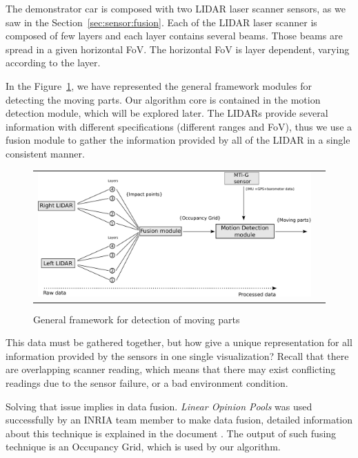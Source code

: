 The demonstrator car is composed with two LIDAR laser scanner sensors, as we saw in the Section~\ref{sec:sensor:fusion}. Each of the LIDAR laser scanner is composed of few layers and each layer contains several beams. Those beams are spread in a given horizontal FoV. The horizontal FoV is layer dependent, varying according to the layer.

In the Figure~\ref{fig:motion:framework}, we have represented the general framework modules for detecting the moving parts. Our algorithm core is contained in the motion detection module, which will be explored later. The LIDARs provide several information with different specifications (different ranges and FoV), thus we use a fusion module to gather the information provided by all of the LIDAR in a single consistent manner.

\begin{figure}[H]
   \centering
     \begin{tabular}{lr}
       \includegraphics[scale=0.30]{img/fig:motion:framework}
     \end{tabular}
   \caption{General framework for detection of moving parts}
   \label{fig:motion:framework}
\end{figure}

This data must be gathered together, but how give a unique representation for all information provided by the sensors in one single visualization? Recall that there are overlapping scanner reading, which means that there may exist conflicting readings due to the sensor failure, or a bad environment condition.

Solving that issue implies in data fusion. \textit{Linear Opinion Pools} was used successfully by an INRIA team member to make data fusion, detailed information about this technique is explained in the document \cite{ADARVE-2012-671211}. The output of such fusing technique is an Occupancy Grid, which is used by our algorithm.

